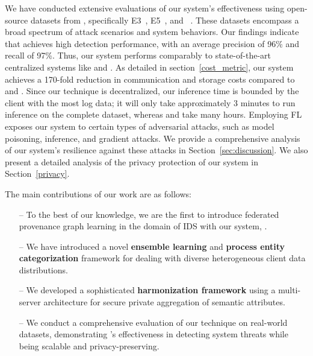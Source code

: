 


We have conducted extensive evaluations of our system's effectiveness using open-source datasets from \darpa, specifically E3~\cite{error3}, E5~\cite{bug5}, and \optc~\cite{anjum2021analyzing}. These datasets encompass a broad spectrum of attack scenarios and system behaviors. Our findings indicate that \Sys achieves high detection performance, with an average precision of 96\% and recall of 97\%. Thus, our system performs comparably to state-of-the-art centralized systems like \flash and \kairos. As detailed in section~\ref{cost_metric}, our system achieves a 170-fold reduction in communication and storage costs compared to \flash and \kairos. Since our technique is decentralized, our inference time is bounded by the client with the most log data; it will only take approximately 3 minutes to run inference on the complete \optc dataset, whereas \flash and \kairos take many hours. Employing FL exposes our system to certain types of adversarial attacks, such as model poisoning, inference, and gradient attacks. We provide a comprehensive analysis of our system's resilience against these attacks in Section~\ref{sec:discussion}. We also present a detailed analysis of the privacy protection of our system in Section~\ref{privacy}.

The main contributions of our work are as follows:

\begin{itemize}[topsep=.1ex,itemsep=-.1ex,leftmargin=*]
    \item[--] To the best of our knowledge, we are the first to introduce federated provenance graph learning in the domain of IDS with our system, \Sys.
    \item[--] We have introduced a novel \textbf{ensemble learning} and \textbf{process entity categorization} framework for dealing with diverse heterogeneous client data distributions.
    \item[--] We developed a sophisticated \textbf{\wordvec harmonization framework} using a multi-server architecture for secure private aggregation of semantic attributes.
    \item[--] We conduct a comprehensive evaluation of our technique on real-world datasets, demonstrating \Sys's effectiveness in detecting system threats while being scalable and privacy-preserving.
\end{itemize}

 